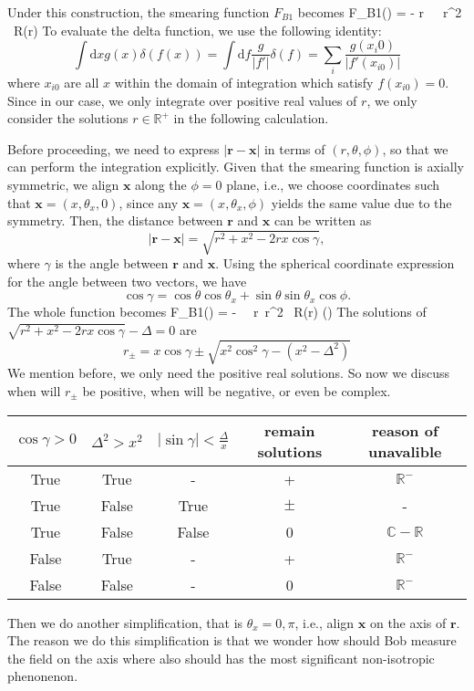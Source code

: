 \documentclass[a4paper,12pt]{article}
\begin{document}
Under this construction, the smearing function $F_{B1}$ becomes
\be
    F_{B1}() = - \int {}r\, \theta\, \phi\, r^2 \sin{\theta} \, R(r)\frac{\delta(\theta)}{\sin{\theta}} 
\ee
To evaluate the delta function, we use the following identity:
\[
    \int \mathrm{d}x g(x) \delta(f(x)) = \int \mathrm{d}f \frac{g}{\left|f'\right|} \delta(f) = \sum_i\frac{g(x_i0)}{\left|f'(x_{i0})\right|}
\]
where $x_{i0}$ are all $x$ within the domain of integration which satisfy $f(x_{i0}) = 0$. Since in our case, we only integrate over positive real values of $r$, we only consider the solutions $r \in \mathbb{R}^+$ in the following calculation.

Before proceeding, we need to express $|\mathbf{r} - \mathbf{x}|$ in terms of $(r, \theta, \phi)$, so that we can perform the integration explicitly. Given that the smearing function is axially symmetric, we align $\mathbf{x}$ along the $\phi = 0$ plane, i.e., we choose coordinates such that $\mathbf{x} = (x, \theta_x, 0)$, since any $\mathbf{x} = (x, \theta_x, \phi)$ yields the same value due to the symmetry. Then, the distance between $\mathbf{r}$ and $\mathbf{x}$ can be written as
\[
|\mathbf{r} - \mathbf{x}| = \sqrt{r^2 + x^2 - 2rx \cos\gamma},
\]
where $\gamma$ is the angle between $\mathbf{r}$ and $\mathbf{x}$. Using the spherical coordinate expression for the angle between two vectors, we have
\[
\cos\gamma = \cos\theta \cos\theta_x + \sin\theta \sin\theta_x \cos\phi.
\]
The whole function becomes
\be
    F_{B1}() = - \int {}\theta\, \phi\, r\, r^2 \, R(r) \delta(\theta) 
\ee
The solutions of $\sqrt{r^2 + x^2 - 2rx \cos\gamma} - \Delta = 0$ are
\[
    r_\pm = x\cos\gamma \pm \sqrt{x^2 \cos^2\gamma - (x^2 - \Delta^2)}
\]
We mention before, we only need the positive real solutions. So now we discuss when will $r_\pm$ be positive, when will be negative, or even be complex.
\begin{center}
  \begin{tabular}{|c|c|c|c|c|}
    \hline
    $\cos{\gamma} > 0$ & $\Delta^2 > x^2$ & $\left|\sin\gamma\right| < \frac{\Delta}{x}$ & remain solutions & reason of unavalible\\
    \hline\hline
    True & True & - & + & $\mathbb{R^-}$\\
    True & False & True & $\pm$ & -\\
    True & False & False & 0 & $\mathbb{C-R}$\\
    False & True & - & + & $\mathbb{R^-}$\\
    False & False & - & 0 & $\mathbb{R^-}$\\
    \hline
  \end{tabular}
\end{center}
Then we do another simplification, that is $\theta_x = 0, \pi$, i.e., align $\mathbf{x}$ on the axis of $\mathbf{r}$. The reason we do this simplification is that we wonder how should Bob measure the field on the axis where also should has the most significant non-isotropic phenonenon.
\end{document}

